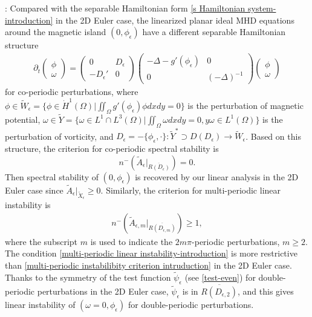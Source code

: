 \documentclass[1 [leqno, 11pt]{amsart}
\numberwithin{equation}{section}
\let\ep=\epsilon
\begin{document}
\begin{CJK*}{GBK}{song}
:
Compared with the separable Hamiltonian form \eqref{s Hamiltonian system-introduction} in the 2D Euler case,  the linearized  planar ideal MHD equations around the  magnetic island $(0,\phi_{\ep})$ have a  different separable Hamiltonian structure
\begin{align*}
\partial_t \left( \begin{array}{c} \phi \\ \omega \end{array} \right) = \left( \begin{array}{cc} 0 & D_\ep \\ -D_{\ep}' & 0 \end{array} \right)\left( \begin{array}{cc}-\Delta-g'(\phi_{\ep}) & 0 \\ 0 & (-\Delta)^{-1} \end{array} \right) \left( \begin{array}{c} \phi \\ \omega \end{array} \right)
\end{align*}
for  co-periodic perturbations, where
$\phi\in\tilde W_{\ep}=\{ \phi \in\dot{H}^1(\Omega) | \iint_\Omega g'(\phi_\ep)\phi dxdy=0\}$ is the perturbation of magnetic potential,
$\omega\in \tilde Y=\{\omega\in L^1\cap L^3 (\Omega)|\iint_{\Omega}\omega dxdy=0,y\omega\in L^1(\Omega)\}$ is the perturbation of vorticity,
  and $D_\ep=-\{\phi_{\ep},\cdot\}:\tilde Y^*\supset D(D_\ep)\to\tilde W_{\ep}$.
Based on this structure, the criterion for co-periodic spectral stability  is
$$n^-\left(\tilde A_{\ep}|_{\overline{R(D_{\ep})}}\right)=0.$$
Then spectral stability of $(0,\phi_{\ep})$ is recovered by our linear analysis in the 2D Euler case since $\tilde A_\ep|_{\tilde X_\ep}\geq0$.
Similarly, the criterion for multi-periodic linear instability is
\begin{align}\label{multi-periodic linear instability-introduction}
n^-\left(\tilde A_{\ep,m}|_{\overline{R(D_{\ep,m})}}\right)\geq1,
\end{align}
where the subscript $m$ is  used  to indicate the $2m\pi$-periodic perturbations, $m\geq2$. The condition \eqref{multi-periodic linear instability-introduction} is more restrictive than \eqref{multi-periodic instabilibity criterion intruduction} in the 2D Euler case.
  Thanks to the symmetry of
  the test function $\tilde{\psi}_\ep$ (see \eqref{test-even}) for double-periodic perturbations in the 2D Euler case,  $\tilde{\psi}_\ep$ is in $\overline{R(D_{\ep,2})}$, and this gives linear instability of $(\omega=0,\phi_{\ep})$ for double-periodic perturbations.

\end{CJK*}
\end{document}
